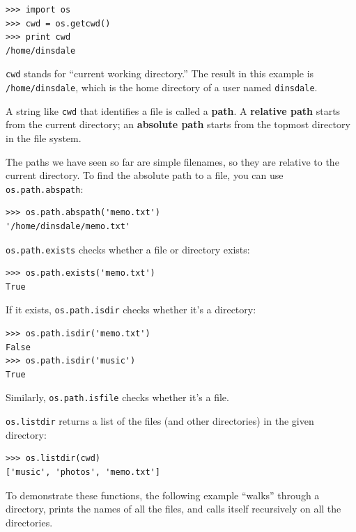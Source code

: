 \documentclass[10pt]{book}
\begin{document}

\beforeverb
\begin{verbatim}
>>> import os
>>> cwd = os.getcwd()
>>> print cwd
/home/dinsdale
\end{verbatim}
\afterverb
%
{\tt cwd} stands for ``current working directory.''  The result in
this example is {\tt /home/dinsdale}, which is the home directory of a
user named {\tt dinsdale}.


A string like {\tt cwd} that identifies a file is called a {\bf path}.
A {\bf relative path} starts from the current directory;
an {\bf absolute path} starts from the topmost directory in the
file system.


The paths we have seen so far are simple filenames, so they are
relative to the current directory.  To find the absolute path to
a file, you can use {\tt os.path.abspath}:

\beforeverb
\begin{verbatim}
>>> os.path.abspath('memo.txt')
'/home/dinsdale/memo.txt'
\end{verbatim}
\afterverb
%
{\tt os.path.exists} checks
whether a file or directory exists:


\beforeverb
\begin{verbatim}
>>> os.path.exists('memo.txt')
True
\end{verbatim}
\afterverb
%
If it exists, {\tt os.path.isdir} checks whether it's a directory:

\beforeverb
\begin{verbatim}
>>> os.path.isdir('memo.txt')
False
>>> os.path.isdir('music')
True
\end{verbatim}
\afterverb
%
Similarly, {\tt os.path.isfile} checks whether it's a file.

{\tt os.listdir} returns a list of the files (and other directories)
in the given directory:

\beforeverb
\begin{verbatim}
>>> os.listdir(cwd)
['music', 'photos', 'memo.txt']
\end{verbatim}
\afterverb
%
To demonstrate these functions, the following example
``walks'' through a directory, prints
the names of all the files, and calls itself recursively on
all the directories.
\end{document}
